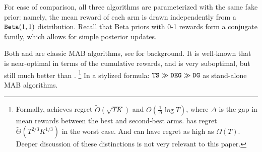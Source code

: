 \documentclass[../competing_bandits.tex]{subfiles}
\begin{document}
For ease of comparison, all three algorithms are parameterized with the same fake prior: namely, the mean reward of each arm is drawn independently from a $\mathtt{Beta}(1,1)$ distribution. Recall that Beta priors with 0-1 rewards form a conjugate family, which allows for simple posterior updates.

Both \DEG and \TS are classic MAB algorithms, see \cite{Bubeck-survey12,TS-survey-FTML18} for background. It is well-known that \TS is near-optimal in terms of the cumulative rewards, and \DEG is very suboptimal, but still much better than \DG.%
\footnote{Formally, \TS achieves regret 
    $\tilde{O}(\sqrt{TK})$ and
    $O(\tfrac{1}{\Delta} \log T)$,
where $\Delta$ is the gap in mean rewards between the best and second-best arms. \DEG has regret $\tilde{\Theta}(T^{2/3} K^{1/3})$ in the worst case. And \DG can have regret as high as $\Omega(T)$. Deeper discussion of these distinctions is not very relevant to this paper.}
In a stylized formula:
    $ \mathtt{TS} \gg \mathtt{DEG} \gg \mathtt{DG} $
as stand-alone MAB algorithms.
\end{document}
